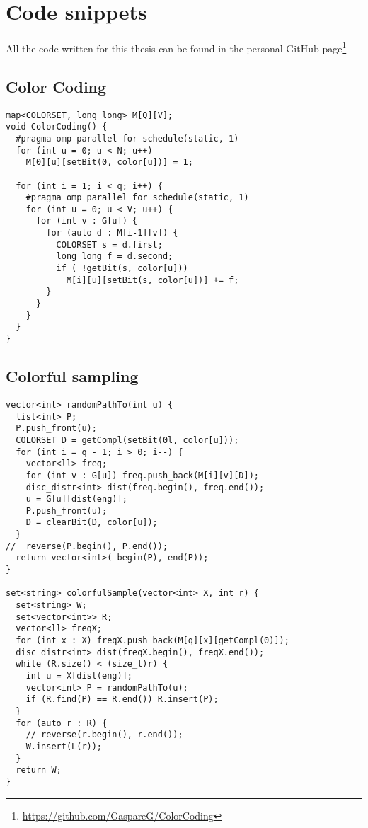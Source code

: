 

\chapter{Code snippets}
  
  All the code written for this thesis can be found in the personal GitHub page\footnote{\url{https://github.com/GaspareG/ColorCoding}}

\section{Color Coding}

\begin{lstlisting}
map<COLORSET, long long> M[Q][V];
void ColorCoding() {
  #pragma omp parallel for schedule(static, 1)
  for (int u = 0; u < N; u++)
    M[0][u][setBit(0, color[u])] = 1;

  for (int i = 1; i < q; i++) {
    #pragma omp parallel for schedule(static, 1)
    for (int u = 0; u < V; u++) {
      for (int v : G[u]) {
        for (auto d : M[i-1][v]) {
          COLORSET s = d.first;
          long long f = d.second;
          if ( !getBit(s, color[u]))
            M[i][u][setBit(s, color[u])] += f;
        }
      }
    }
  }
}
\end{lstlisting}


\clearpage
\section{Colorful sampling}

\begin{lstlisting}
vector<int> randomPathTo(int u) {
  list<int> P;
  P.push_front(u);
  COLORSET D = getCompl(setBit(0l, color[u]));
  for (int i = q - 1; i > 0; i--) {
    vector<ll> freq;
    for (int v : G[u]) freq.push_back(M[i][v][D]);
    disc_distr<int> dist(freq.begin(), freq.end());
    u = G[u][dist(eng)];
    P.push_front(u);
    D = clearBit(D, color[u]);
  }
//  reverse(P.begin(), P.end());
  return vector<int>( begin(P), end(P));
}

set<string> colorfulSample(vector<int> X, int r) {
  set<string> W;
  set<vector<int>> R;
  vector<ll> freqX;
  for (int x : X) freqX.push_back(M[q][x][getCompl(0)]);
  disc_distr<int> dist(freqX.begin(), freqX.end());
  while (R.size() < (size_t)r) {
    int u = X[dist(eng)];
    vector<int> P = randomPathTo(u);
    if (R.find(P) == R.end()) R.insert(P);
  }
  for (auto r : R) {
    // reverse(r.begin(), r.end());
    W.insert(L(r));
  }
  return W;
}
\end{lstlisting}

